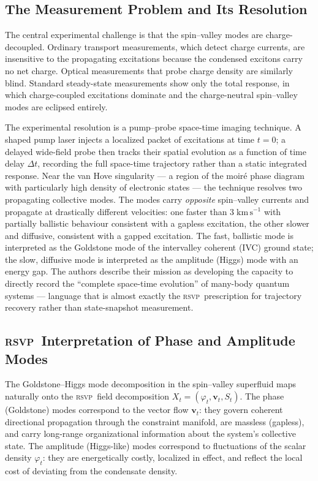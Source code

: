 \documentclass[11pt,a4paper]{article}
\theoremstyle{plain}
\theoremstyle{definition}
\theoremstyle{remark}
\newcommand{\RSVP}{\textup{\textsc{rsvp}}}
\begin{document}
\subsection{The Measurement Problem and Its Resolution}

The central experimental challenge is that the spin--valley modes are
charge-decoupled. Ordinary transport measurements, which detect charge
currents, are insensitive to the propagating excitations because the condensed
excitons carry no net charge. Optical measurements that probe charge density
are similarly blind. Standard steady-state measurements show only the total
response, in which charge-coupled excitations dominate and the
charge-neutral spin--valley modes are eclipsed entirely.

The experimental resolution is a pump--probe space-time imaging technique.
A shaped pump laser injects a localized packet of excitations at time $t=0$;
a delayed wide-field probe then tracks their spatial evolution as a function
of time delay $\Delta t$, recording the full space-time trajectory rather
than a static integrated response. Near the van Hove singularity --- a region
of the moiré phase diagram with particularly high density of electronic states
--- the technique resolves two propagating collective modes. The modes carry
\textit{opposite} spin--valley currents and propagate at drastically different
velocities: one faster than $3\;\mathrm{km\,s^{-1}}$ with partially
ballistic behaviour consistent with a gapless excitation, the other slower
and diffusive, consistent with a gapped excitation. The fast, ballistic mode
is interpreted as the Goldstone mode of the intervalley coherent (IVC)
ground state; the slow, diffusive mode is interpreted as the amplitude
(Higgs) mode with an energy gap. The authors describe their mission as
developing the capacity to directly record the ``complete space-time
evolution'' of many-body quantum systems --- language that is
almost exactly the \RSVP\ prescription for trajectory recovery rather than
state-snapshot measurement.

\subsection{\RSVP\ Interpretation of Phase and Amplitude Modes}

The Goldstone--Higgs mode decomposition in the spin--valley superfluid maps
naturally onto the \RSVP\ field decomposition $X_t = (\varphi_t,
\mathbf{v}_t, S_t)$. The phase (Goldstone) modes correspond to the
vector flow $\mathbf{v}_t$: they govern coherent directional propagation
through the constraint manifold, are massless (gapless), and carry
long-range organizational information about the system's collective state.
The amplitude (Higgs-like) modes correspond to fluctuations of the scalar
density $\varphi_t$: they are energetically costly, localized in effect,
and reflect the local cost of deviating from the condensate density.
\end{document}
